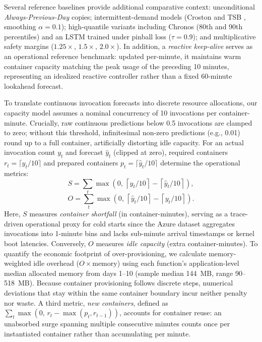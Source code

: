 \documentclass[conference,a4paper]{IEEEtran}
\begin{document}
Several reference baselines provide additional comparative context: unconditional \textit{Always-Previous-Day} copies; intermittent-demand models (Croston and TSB \cite{teunter2011tsb}, smoothing $\alpha=0.1$); high-quantile variants including Chronos (80th and 90th percentiles) and an LSTM trained under pinball loss ($\tau=0.9$); and multiplicative safety margins ($1.25\times$, $1.5\times$, $2.0\times$). In addition, a \textit{reactive keep-alive} serves as an operational reference benchmark: updated per-minute, it maintains warm container capacity matching the peak usage of the preceding 10 minutes, representing an idealized reactive controller rather than a fixed 60-minute lookahead forecast.

To translate continuous invocation forecasts into discrete resource allocations, our capacity model assumes a nominal concurrency of 10 invocations per container-minute. Crucially, raw continuous predictions below 0.5 invocations are clamped to zero; without this threshold, infinitesimal non-zero predictions (e.g., 0.01) round up to a full container, artificially distorting idle capacity. For an actual invocation count $y_t$ and forecast $\hat{y}_t$ (clipped at zero), required containers $r_t = \lceil y_t / 10 \rceil$ and prepared containers $p_t = \lceil \hat{y}_t / 10 \rceil$ determine the operational metrics:
\begin{equation}
S = \sum_{t} \max\!\left(0,\, \left\lceil y_t / 10 \right\rceil - \left\lceil \hat{y}_t / 10 \right\rceil\right),
\label{eq:under}
\end{equation}
\begin{equation}
O = \sum_{t} \max\!\left(0,\, \left\lceil \hat{y}_t / 10 \right\rceil - \left\lceil y_t / 10 \right\rceil\right).
\label{eq:over}
\end{equation}
Here, $S$ measures \textit{container shortfall} (in container-minutes), serving as a trace-driven operational proxy for cold starts since the Azure dataset aggregates invocations into 1-minute bins and lacks sub-minute arrival timestamps or kernel boot latencies. Conversely, $O$ measures \textit{idle capacity} (extra container-minutes). To quantify the economic footprint of over-provisioning, we calculate memory-weighted idle overhead ($O \times \text{memory}$) using each function's application-level median allocated memory from days 1--10 (sample median 144~MB, range 90--518~MB). Because container provisioning follows discrete steps, numerical deviations that stay within the same container boundary incur neither penalty nor waste. A third metric, \textit{new containers}, defined as $\sum_t \max(0,\, r_t - \max(p_t, r_{t-1}))$, accounts for container reuse: an unabsorbed surge spanning multiple consecutive minutes counts once per instantiated container rather than accumulating per minute.
\end{document}
